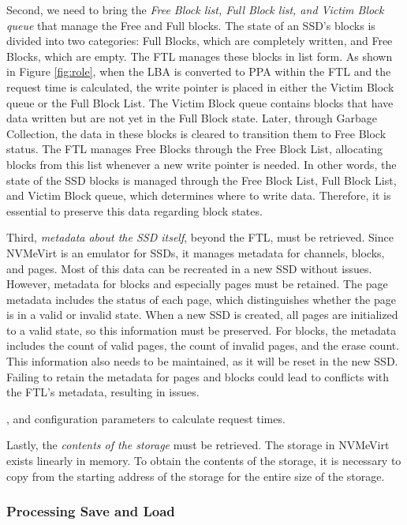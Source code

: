 Second, we need to bring the \emph{Free Block list, Full Block list, and Victim Block queue} that manage the Free and Full blocks.
The state of an SSD's blocks is divided into two categories: Full Blocks, which are completely written, and Free Blocks, which are empty.
The FTL manages these blocks in list form.
As shown in Figure \ref{fig:role}, when the LBA is converted to PPA within the FTL and the request time is calculated, the write pointer is placed in either the Victim Block queue or the Full Block List.
The Victim Block queue contains blocks that have data written but are not yet in the Full Block state.
Later, through Garbage Collection, the data in these blocks is cleared to transition them to Free Block status.
The FTL manages Free Blocks through the Free Block List, allocating blocks from this list whenever a new write pointer is needed.
In other words, the state of the SSD blocks is managed through the Free Block List, Full Block List, and Victim Block queue, which determines where to write data.
Therefore, it is essential to preserve this data regarding block states.


Third, \emph{metadata about the SSD itself}, beyond the FTL, must be retrieved.
Since NVMeVirt is an emulator for SSDs, it manages metadata for channels, blocks, and pages.
Most of this data can be recreated in a new SSD without issues.
However, metadata for blocks and especially pages must be retained.
The page metadata includes the status of each page, which distinguishes whether the page is in a valid or invalid state.
When a new SSD is created, all pages are initialized to a valid state, so this information must be preserved.
For blocks, the metadata includes the count of valid pages, the count of invalid pages, and the erase count.
This information also needs to be maintained, as it will be reset in the new SSD.
Failing to retain the metadata for pages and blocks could lead to conflicts with the FTL's metadata, resulting in issues.

, and configuration parameters to calculate request times.


Lastly, the \emph{contents of the storage} must be retrieved.
The storage in NVMeVirt exists linearly in memory.
To obtain the contents of the storage, it is necessary to copy from the starting address of the storage for the entire size of the storage.


\subsubsection{Processing Save and Load}

